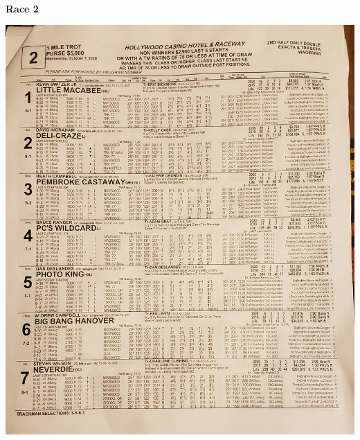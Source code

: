 \documentclass{article}
\begin{document}
\begin{center}
\small{~\\}
\textbf{\LARGE{\textcolor[rgb]{0,0,0}{Race 2 }}}\\
\begin{turn}{0}
\includegraphics[scale=0.12]{race02.jpg}
\end{turn}
\end{center}

\newpage
\end{document}
